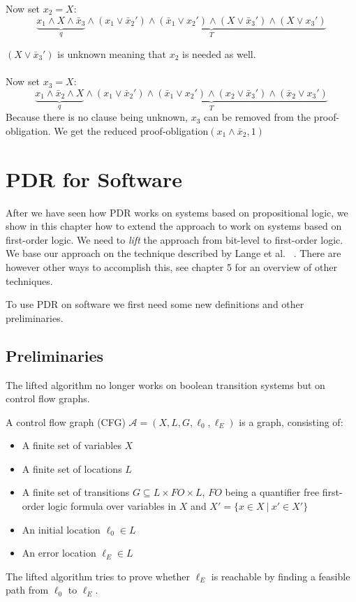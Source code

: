 \documentclass[11pt, a4paper, BCOR=10mm, ngerman]{scrbook}
\begin{document}
Now set $x_2 = X$: \\
\begin{equation*}
\underbrace{x_1 \land X \land \bar x_3}_{q} \land \underbrace{(x_1 \lor \bar x_2' ) \land ( \bar x_1 \lor x_2') \land (X \lor \bar x_3') \land ( X \lor x_3')}_{T}
\end{equation*}

$(X \lor \bar x_3')$ is unknown meaning that $x_2$  is needed as well. \\ \\

Now set $x_3 = X$: \\
\begin{equation*}
\underbrace{x_1 \land \bar x_2 \land X}_{q} \land \underbrace{(x_1 \lor \bar x_2' ) \land ( \bar x_1 \lor x_2') \land (x_2 \lor \bar x_3') \land ( \bar x_2 \lor x_3')}_{T}
\end{equation*}
Because there is no clause being unknown, $x_3$ can be removed from the proof-obligation. We get the reduced proof-obligation$(x_1 \land \bar x_2, 1)$

\pagebreak


\chapter{PDR for Software} \label{sec3}
After we have seen how PDR works on systems based on propositional logic, we show in this chapter how to extend the approach to work on systems based on first-order logic. We need to \textsl{lift} the approach from bit-level to first-order logic. We base our approach on the technique described by Lange et al. ~\cite{DBLP:conf/fmcad/0001NN15}. There are however other ways to accomplish this, see chapter 5 for an overview of other techniques. \par To use PDR on software we first need some new definitions and other preliminaries.

\section{Preliminaries}


The lifted algorithm no longer works on boolean transition systems but on control flow graphs.

A control flow graph (CFG) $\mathcal{A} = (X, L, G, \ell_0, \ell_E)$ is a graph, consisting of: 
\begin{itemize}
\item A finite set of variables $X$
\item A finite set of locations $L$
\item A finite set of transitions $G \subseteq L \times FO \times L$, $FO$ being a quantifier free first-order logic formula over variables in $X$ and $X' = \{x \in X \ | \ x' \in X'\}$
\item An initial location $\ell_0 \in L$
\item  An error location $\ell_E \in L$
\end{itemize}
The lifted algorithm tries to prove whether $\ell_E$ is reachable by finding a feasible path from $\ell_0$ to $\ell_E$. \par
\end{document}
